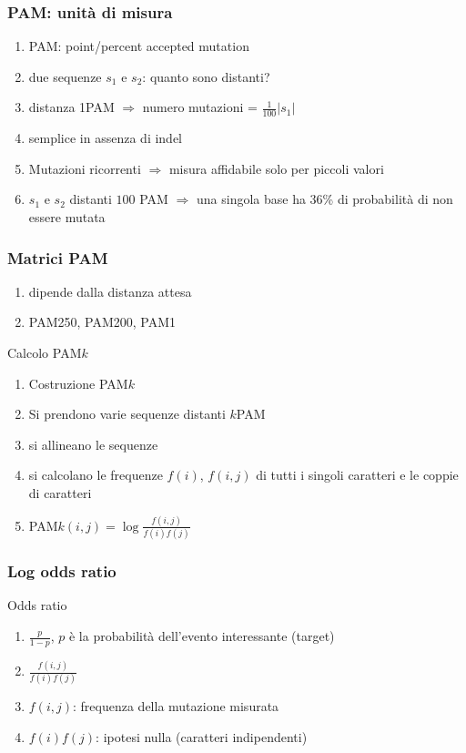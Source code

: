 \begin{frame}[fragile]
\frametitle{PAM: unità di misura}
\begin{enumerate}
\item
PAM: point/percent accepted mutation
\item
due sequenze $s_{1}$ e $s_{2}$: quanto sono distanti?
\item
distanza 1PAM $\Rightarrow$ numero mutazioni = $\frac{1}{100} |s_{1}|$
\item
semplice in assenza di indel
\item
Mutazioni ricorrenti $\Rightarrow$ misura affidabile solo per piccoli valori
\item
$s_{1}$ e $s_{2}$ distanti $100$ PAM $\Rightarrow$ una singola base ha 36\% di
probabilità di non essere mutata
\end{enumerate}
\end{frame}

\begin{frame}[fragile]
\frametitle{Matrici PAM}
\begin{enumerate}
\item
dipende dalla distanza attesa
\item
PAM250, PAM200, PAM1
\end{enumerate}
\begin{block}{Calcolo PAM$k$}
\begin{enumerate}
\item
Costruzione PAM$k$
\item
Si prendono varie sequenze distanti $k$PAM
\item
si allineano le sequenze
\item
si calcolano le frequenze $f(i)$, $f(i,j)$ di tutti i singoli caratteri e le
coppie di caratteri
\item
PAM$k(i,j)=\log\frac{f(i,j)}{f(i)f(j)}$
\end{enumerate}
\end{block}
\end{frame}

\begin{frame}[fragile]
\frametitle{Log odds ratio}
\begin{block}{Odds ratio}
\begin{enumerate}
\item
$\frac{p}{1-p}$, $p$ è la probabilità dell'evento interessante (target)
\item
$\frac{f(i,j)}{f(i)f(j)}$
\item
$f(i,j)$: frequenza della mutazione misurata
\item
$f(i)f(j)$: ipotesi nulla (caratteri indipendenti)
\end{enumerate}
\end{block}
\end{frame}


